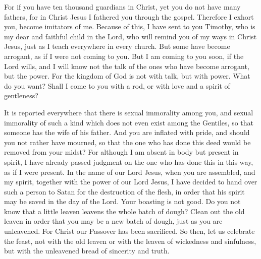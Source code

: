 \begin{biblechapter}
\verse For if you have ten thousand guardians in Christ, yet you do not have many fathers, for in Christ Jesus I fathered you through the gospel.
\verse Therefore I exhort you, become imitators of me.
\verse Because of this, I have sent to you Timothy, who is my dear and faithful child in the Lord, who will remind you of my ways in Christ Jesus, just as I teach everywhere in every church.
\verse But some have become arrogant, as if I were not coming to you.
\verse But I am coming to you soon, if the Lord wills, and I will know not the talk of the ones who have become arrogant, but the power.
\verse For the kingdom of God is not with talk, but with power.
\verse What do you want? Shall I come to you with a rod, or with love and a spirit of gentleness?
\end{biblechapter}

\begin{biblechapter} %
 It is reported everywhere that there is sexual immorality among you, and sexual immorality of such a kind which does not even exist among the Gentiles, so that someone has the wife of his father.
\verse And you are inflated with pride, and should you not rather have mourned, so that the one who has done this deed would be removed from your midst?
\verse For although I am absent in body but present in spirit, I have already passed judgment on the one who has done this in this way, as if I were present.
\verse In the name of our Lord Jesus, when you are assembled, and my spirit, together with the power of our Lord Jesus,
\verse I have decided to hand over such a person to Satan for the destruction of the flesh, in order that his spirit may be saved in the day of the Lord.
\verse Your boasting is not good. Do you not know that a little leaven leavens the whole batch of dough?
\verse Clean out the old leaven in order that you may be a new batch of dough, just as you are unleavened. For Christ our Passover has been sacrificed.
\verse So then, let us celebrate the feast, not with the old leaven or with the leaven of wickedness and sinfulness, but with the unleavened bread of sincerity and truth.

\end{biblechapter}
